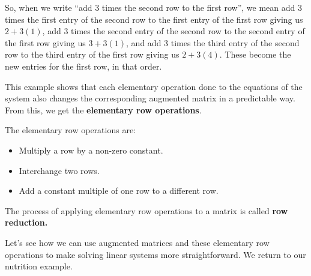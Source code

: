 \begin{example}
	So, when we write ``add 3 times the second row to the first row'', we mean add 3 times the first entry of the second row to the first entry of the first row giving us $2 + 3(1)$,  add 3 times the second entry of the second row to the second entry of the first row giving us $3 + 3(1)$, and  add 3 times the third entry of the second row to the third entry of the first row giving us $2 + 3(4)$. These become the new entries for the first row, in that order.

\end{example}

This example shows that each elementary operation done to the equations of the system also changes the corresponding augmented matrix in a predictable way. From this, we get the \textbf{elementary row operations}.

\begin{definition}
	The elementary row operations are:
	\begin{itemize}
		\item Multiply a row by a non-zero constant.
		\item Interchange two rows.
		\item Add a constant multiple of one row to a different row.
	\end{itemize}
	
	The process of applying elementary row operations to a matrix is called \textbf{row reduction.}

\end{definition}

Let's see how we can use augmented matrices and these elementary row operations to make solving linear systems more straightforward. We return to our nutrition example.

